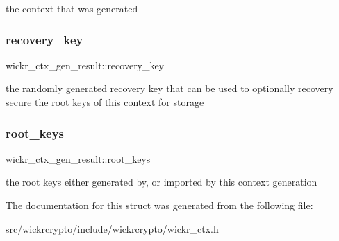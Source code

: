 the context that was generated \mbox{\label{structwickr__ctx__gen__result_a32feaf76def6c13abe0240c6ae669999}} 
\subsubsection{\texorpdfstring{recovery\+\_\+key}{recovery\_key}}
{\footnotesize\ttfamily wickr\+\_\+ctx\+\_\+gen\+\_\+result\+::recovery\+\_\+key}

the randomly generated recovery key that can be used to optionally recovery secure the root keys of this context for storage \mbox{\label{structwickr__ctx__gen__result_a42600241a65a968de4f84120d9031320}} 
\subsubsection{\texorpdfstring{root\+\_\+keys}{root\_keys}}
{\footnotesize\ttfamily wickr\+\_\+ctx\+\_\+gen\+\_\+result\+::root\+\_\+keys}

the root keys either generated by, or imported by this context generation 

The documentation for this struct was generated from the following file\+:\begin{DoxyCompactItemize}
\item 
src/wickrcrypto/include/wickrcrypto/wickr\+\_\+ctx.\+h\end{DoxyCompactItemize}
